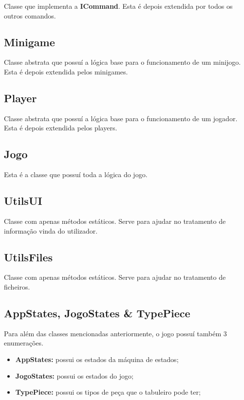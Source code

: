 \documentclass[11pt]{article}
\begin{document}
	Classe que implementa a \textbf{ICommand}. Esta é depois extendida por todos os outros comandos.
	
	
	\large
	\subsection{Minigame}
	\normalsize
	
	Classe abstrata que possuí a lógica base para o funcionamento de um minijogo. Esta é depois extendida pelos minigames.
	
	
	\large
	\subsection{Player}
	\normalsize
	
	Classe abstrata que possuí a lógica base para o funcionamento de um jogador. Esta é depois extendida pelos players.
	
	\large
	\subsection{Jogo}
	\normalsize
	
	Esta é a classe que possuí toda a lógica do jogo.
	
	
	\large
	\subsection{UtilsUI}
	\normalsize
	
	Classe com apenas métodos estáticos. Serve para ajudar no tratamento de informação vinda do utilizador.
	
	
	\large
	\subsection{UtilsFiles}
	\normalsize
	
	Classe com apenas métodos estáticos. Serve para ajudar no tratamento de ficheiros.
	
	
	\large
	\subsection{AppStates, JogoStates \& TypePiece}
	\normalsize
	
	Para além das classes mencionadas anteriormente, o jogo possuí também 3 enumerações.
	
	\begin{itemize}
		\item \textbf{AppStates:} possui os estados da máquina de estados;
		\item \textbf{JogoStates:} possui os estados do jogo;
		\item \textbf{TypePiece:} possui os tipos de peça que o tabuleiro pode ter;
	\end{itemize}
\end{document}

